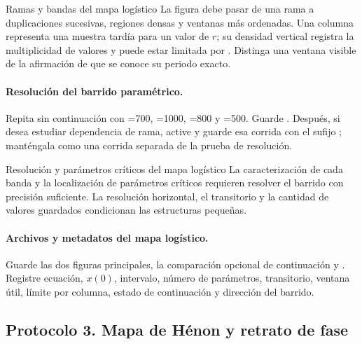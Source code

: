 \begin{cajaverde}{Ramas y bandas del mapa logístico}
La figura debe pasar de una rama a duplicaciones sucesivas, regiones densas y
ventanas más ordenadas. Una columna representa una muestra tardía para un valor
de \(r\); su densidad vertical registra la multiplicidad de valores y puede estar limitada por
. Distinga una ventana visible de la afirmación de
que se conoce su periodo exacto.
\end{cajaverde}


\paragraph{Resolución del barrido paramétrico.}
Repita sin continuación con =700,
=1000, =800 y
=500. Guarde
. Después, si desea estudiar dependencia
de rama, active  y guarde esa corrida con el sufijo
; manténgala como una corrida separada de la prueba de resolución.

\begin{cajaalerta}{Resolución y parámetros críticos del mapa logístico}
La caracterización de cada banda y la localización de parámetros críticos requieren
resolver el barrido con precisión suficiente. La resolución horizontal, el
transitorio y la cantidad de valores guardados condicionan las estructuras
pequeñas.
\end{cajaalerta}

\paragraph{Archivos y metadatos del mapa logístico.}
Guarde las dos figuras principales, la comparación opcional de continuación y
. Registre ecuación, \(x(0)\), intervalo,
número de parámetros, transitorio, ventana útil, límite por columna, estado de
continuación y dirección del barrido.

\subsection{Protocolo 3. Mapa de Hénon y retrato de fase}

